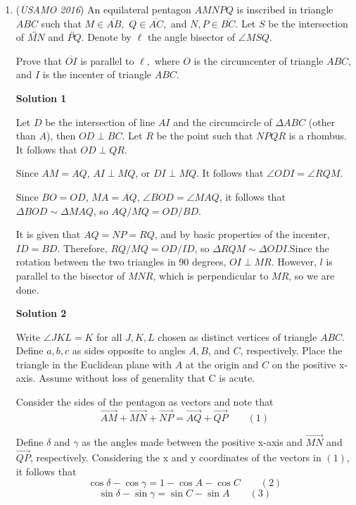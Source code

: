 \begin{enumerate}
 


 


	\item (\textit{USAMO 2016}) An equilateral pentagon $AMNPQ$ is inscribed in triangle $ABC$ such that $M\in\overline{AB},$ $Q\in\overline{AC},$ and $N, P\in\overline{BC}.$ Let $S$ be the intersection of $\overleftrightarrow{MN}$ and $\overleftrightarrow{PQ}.$ Denote by $\ell$ the angle bisector of $\angle MSQ.$


 Prove that $\overline{OI}$ is parallel to $\ell,$ where $O$ is the circumcenter of triangle $ABC,$ and $I$ is the incenter of triangle $ABC.$




\textbf{Solution 1}

Let  $D$ be the intersection of line $AI$ and the circumcircle of $\Delta ABC$ (other than $A$), then $OD\perp BC$. Let $R$ be the point such that $NPQR$ is a rhombus. It follows that $OD\perp QR$.

 Since $AM=AQ$, $AI\perp MQ$, or $DI\perp MQ$. It follows that $\angle ODI=\angle RQM$.

 Since $BO=OD$, $MA=AQ$, $\angle BOD=\angle MAQ$, it follows that $\Delta BOD\sim\Delta MAQ$, so $AQ/MQ=OD/BD$.

 It is given that $AQ=NP=RQ$, and by basic properties of the incenter, $ID=BD$. Therefore, $RQ/MQ=OD/ID$, so $\Delta RQM\sim\Delta ODI$.Since the rotation between the two triangles in 90 degrees, $OI\perp MR$. However, $l$ is parallel to the bisector of $MNR$, which is perpendicular to $MR$, so we are done.

 



\textbf{Solution 2}

Write $\angle{JKL} = K$ for all $J,K,L$ chosen as distinct vertices of triangle $ABC$. Define $a, b, c$ as sides opposite to angles $A, B$, and $C$, respectively. Place the triangle in the Euclidean plane with $A$ at the origin and $C$ on the positive x-axis. Assume without loss of generality that C is acute.

 Consider the sides of the pentagon as vectors and note that 
 \[\overrightarrow{AM} + \overrightarrow{MN} + \overrightarrow{NP} = \overrightarrow{AQ} + \overrightarrow{QP} \qquad (1)\]

 Define $\delta$ and $\gamma$ as the angles made between the positive x-axis and $\overrightarrow{MN}$ and $\overrightarrow{QP}$, respectively. Considering the x and y coordinates of the vectors in $(1)$, it follows that
 \[\cos \delta - \cos \gamma = 1 - \cos A - \cos C     \qquad (2)\]
 \[\sin \delta - \sin \gamma = \sin C - \sin A        \qquad (3)\]


\end{enumerate}
